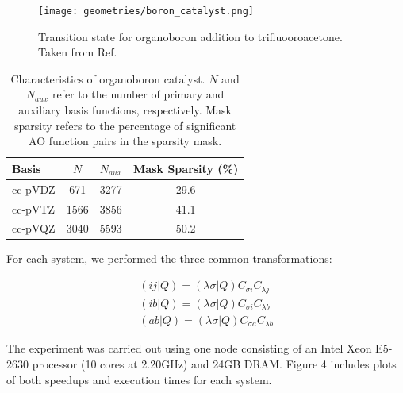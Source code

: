 \begin{figure}[H] 
\centering
\texttt{[image: geometries/boron\_catalyst.png]} \caption{Transition state for organoboron addition to trifluooroacetone. Taken from Ref. \cite{???Lec:2016:768}} 
\label{fig:databases} \end{figure}

\begingroup
\begin{table}[H]
\centering
\renewcommand{\baselinestretch}{1}
\caption{Characteristics of organoboron catalyst.
$N$ and $N_{aux}$ refer to the number of primary and auxiliary basis functions, respectively.
Mask sparsity refers to the percentage of significant AO function pairs in the sparsity mask.}
\begin{tabular}{l ccc}
\multicolumn{1}{l}{\textbf{Basis}} &
\multicolumn{1}{c}{\textbf{$N$}} &
\multicolumn{1}{c}{\textbf{$N_{aux}$}} &
\multicolumn{1}{c}{\textbf{Mask Sparsity (\%)}} \\
\hline
cc-pVDZ   & 671  & 3277 & 29.6 \\          
cc-pVTZ   & 1566 & 3856 & 41.1 \\          
cc-pVQZ   & 3040 & 5593 & 50.2 \\          
\end{tabular}
\end{table}
\endgroup


\noindent For each system, we performed the three common transformations:

\begin{align} 
(i j | Q) = (\lambda \sigma | Q) C_{\sigma i} C_{\lambda j} \\
(i b | Q) = (\lambda \sigma | Q) C_{\sigma i} C_{\lambda b} \\
(a b | Q) = (\lambda \sigma | Q) C_{\sigma a} C_{\lambda b} 
\end{align}

\noindent The experiment was carried out using one node consisting of an Intel Xeon E5-2630 processor 
(10 cores at 2.20GHz) and 24GB DRAM. Figure 4 includes plots of both speedups and execution times for each system.

